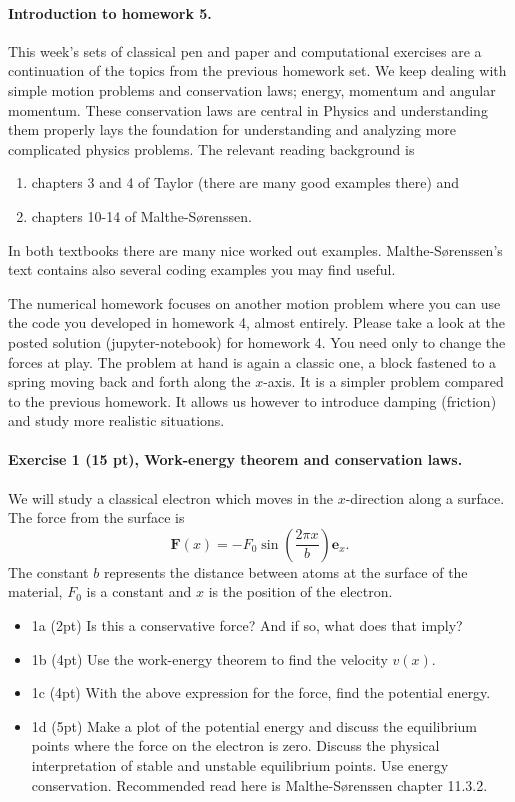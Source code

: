 \documentclass[%
oneside,                 %
final,                   %
10pt]{article}
\begin{document}
\noindent
\paragraph{Introduction to homework 5.}
This week's sets of classical pen and paper and computational
exercises are a continuation of the topics from the previous homework set. We keep dealing with simple motion problems and conservation laws; energy, momentum and angular momentum. These conservation laws are central in Physics and understanding them properly lays the foundation for understanding and analyzing more complicated physics problems.
The relevant reading background is
\begin{enumerate}
\item chapters 3 and 4 of Taylor (there are many good examples there) and

\item chapters 10-14 of Malthe-Sørenssen.
\end{enumerate}

\noindent
In both textbooks there are many nice worked out examples. Malthe-Sørenssen's text contains also several coding examples you may find useful. 

The numerical homework focuses on another motion problem where you can
use the code you developed in homework 4, almost entirely. Please take
a look at the posted solution (jupyter-notebook) for homework 4. You
need only to change the forces at play. The problem at hand is again a
classic one, a block fastened to a spring moving back and forth along the $x$-axis. It is a simpler problem compared to the previous homework. It allows us however to introduce damping (friction) and study more realistic situations. 



\paragraph{Exercise 1 (15 pt), Work-energy theorem and conservation laws.}
We will study a classical electron which moves in the $x$-direction along a surface. The force from the surface is
\[
\bm{F}(x)=-F_0\sin{(\frac{2\pi x}{b})}\bm{e}_x.
\]
The constant $b$ represents the distance between atoms at the surface of the material, $F_0$ is a constant and $x$ is the position of the electron.

\begin{itemize}
\item 1a (2pt) Is this a conservative force? And if so, what does that imply?

\item 1b (4pt) Use the work-energy theorem to find the velocity $v(x)$. 

\item 1c (4pt) With the above expression for the force, find the potential energy.

\item 1d (5pt) Make a plot of the potential energy and discuss the equilibrium points where the force on the electron is zero. Discuss the physical interpretation of stable and unstable equilibrium points. Use energy conservation. Recommended read here  is Malthe-Sørenssen chapter 11.3.2.
\end{itemize}
\end{document}
